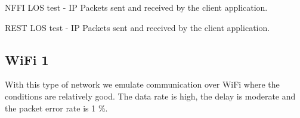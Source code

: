 \begin{landscape}
    \begin{figure}
    \centering
    \begin{floatrow}
    \end{floatrow}
    \end{figure}
\end{landscape}

\begin{table}[h]

\caption{NFFI LOS test - IP Packets sent and received by the client application.}
\label{table:los-test-packets-nffi}
\end{table}

\begin{table}[h]

\caption{REST LOS test - IP Packets sent and received by the client application.}
\label{table:los-test-packets-rest}
\end{table}




\subsection{WiFi 1}

With this type of network we emulate communication over WiFi where the
conditions are relatively good. The data rate is high, the delay is moderate
and the packet error rate is 1 \%.

